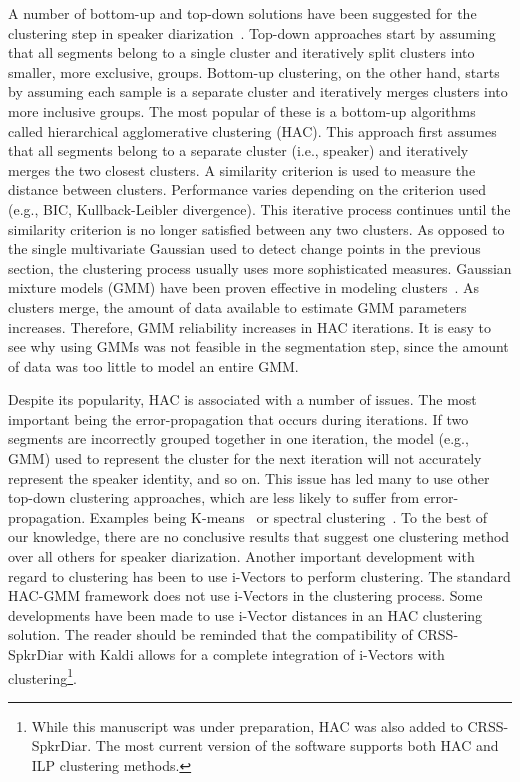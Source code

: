 A number of bottom-up and top-down solutions have been suggested for the clustering step in speaker diarization~\cite{tranterreynolds2006drzoverview,anguera2012DRZreview}. 
Top-down approaches start by assuming that all segments belong to a single cluster and iteratively split clusters into smaller, more exclusive, groups. 
Bottom-up clustering, on the other hand, starts by assuming each sample is a separate cluster and iteratively merges clusters into more inclusive groups. 
The most popular of these is a bottom-up algorithms called hierarchical agglomerative clustering (HAC). 
This approach first assumes that all segments belong to a separate cluster (i.e., speaker) and iteratively merges the two closest clusters. 
A similarity criterion is used to measure the distance between clusters. 
Performance varies depending on the criterion used (e.g., BIC, Kullback-Leibler divergence). 
This iterative process continues until the similarity criterion is no longer satisfied between any two clusters. 
As opposed to the single multivariate Gaussian used to detect change points in the previous section, the clustering process usually uses more sophisticated measures. 
Gaussian mixture models (GMM) have been proven effective in modeling clusters~\cite{zelenak2010albayzin}. 
As clusters merge, the amount of data available to estimate GMM parameters increases. 
Therefore, GMM reliability increases in HAC iterations. 
It is easy to see why using GMMs was not feasible in the segmentation step, since the amount of data was too little to model an entire GMM. 

Despite its popularity, HAC is associated with a number of issues. 
The most important being the error-propagation that occurs during iterations. 
If two segments are incorrectly grouped together in one iteration, the model (e.g., GMM) used to represent the cluster for the next iteration will not accurately represent the speaker identity, and so on. 
This issue has led many to use other top-down clustering approaches, which are less likely to suffer from error-propagation. Examples being K-means~\cite{shum2011exploiting} or spectral clustering~\cite{shum2012spectralclustering, ning2006spectral}. 
To the best of our knowledge, there are no conclusive results that suggest one clustering method over all others for speaker diarization. 
Another important development with regard to clustering has been to use i-Vectors to perform clustering. 
The standard HAC-GMM framework does not use i-Vectors in the clustering process. 
Some developments have been made to use i-Vector distances in an HAC clustering solution. 
The reader should be reminded that the compatibility of CRSS-SpkrDiar with Kaldi allows for a complete integration of i-Vectors with clustering\footnote{While this manuscript was under preparation, HAC was also added to CRSS-SpkrDiar. The most current version of the software supports both HAC and ILP clustering methods.}. 

